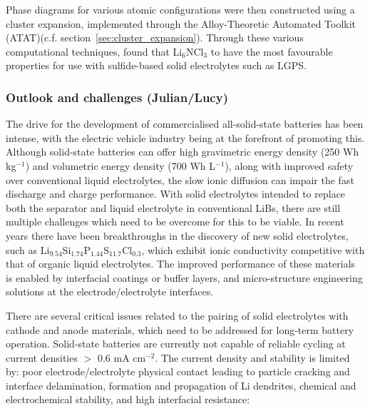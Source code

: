 \documentclass[../main.tex]{subfiles}
\begin{document}
Phase diagrams for various atomic configurations were then constructed using a cluster expansion, implemented through the Alloy-Theoretic Automated Toolkit (ATAT)(c.f. section~\ref{sec:cluster_expansion}).\cite{Hart2008, VandeWalle2002} Through these various computational techniques, \citeauthor{Sang2020} found that Li$_6$NCl$_3$ to have the most favourable properties for use with sulfide-based solid electrolytes such as LGPS.\cite{Sang2020}

\subsubsection{Outlook and challenges (Julian/Lucy)}
\label{sec:outlook_electrolytes}
The drive for the development of commercialised all-solid-state batteries has been intense, with the electric vehicle industry being at the forefront of promoting this.\cite{Woods_2021} Although solid-state batteries can offer high gravimetric energy density (250 Wh kg$^{-1}$) and volumetric energy density (700 Wh L$^{-1}$), along with improved safety over conventional liquid electrolytes, the slow ionic diffusion can impair the fast discharge and charge performance. With solid electrolytes intended to replace both the separator and liquid electrolyte in conventional LiBs, \cite{schnell2020solid} there are still multiple challenges which need to be overcome for this to be viable. In recent years there have been breakthroughs in the discovery of new solid electrolytes, such as Li$_{9.54}$Si$_{1.74}$P$_{1.44}$S$_{11.7}$Cl$_{0.3}$, \cite{kato2016high} which exhibit ionic conductivity competitive with that of organic liquid electrolytes. The improved performance of these materials is enabled by interfacial coatings or buffer layers, and micro-structure engineering solutions at the electrode/electrolyte interfaces.  \cite{kim2021solid}

There are several critical issues related to the pairing of solid electrolytes with cathode and anode materials, which need to be addressed for long-term battery operation. Solid-state batteries are currently not capable of reliable cycling at current densities $>$ 0.6 mA cm$^{-2}$\cite{famprikis_fundamentals_2019, Albertus2018}. The current density and stability is limited by: poor electrode/electrolyte physical contact leading to particle cracking and interface delamination, formation and propagation of Li dendrites, chemical and electrochemical stability, and high interfacial resistance: \cite{famprikis_fundamentals_2019} 
\end{document}
